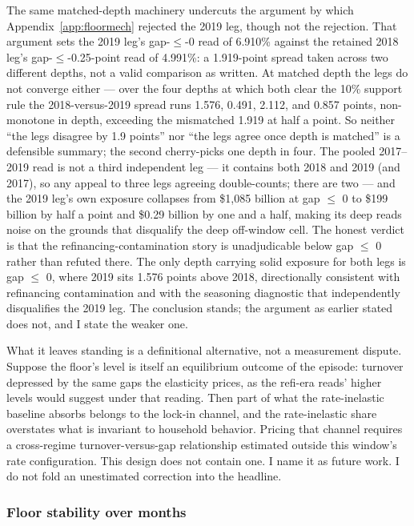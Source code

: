 The same matched-depth machinery undercuts the argument by which Appendix~\ref{app:floormech} rejected the 2019 leg, though not the rejection. That argument sets the 2019 leg's gap-$\leq$-0 read of 6.910\% against the retained 2018 leg's gap-$\leq$-0.25-point read of 4.991\%: a 1.919-point spread taken across two different depths, not a valid comparison as written. At matched depth the legs do not converge either --- over the four depths at which both clear the 10\% support rule the 2018-versus-2019 spread runs 1.576, 0.491, 2.112, and 0.857 points, non-monotone in depth, exceeding the mismatched 1.919 at half a point. So neither ``the legs disagree by 1.9 points'' nor ``the legs agree once depth is matched'' is a defensible summary; the second cherry-picks one depth in four. The pooled 2017--2019 read is not a third independent leg --- it contains both 2018 and 2019 (and 2017), so any appeal to three legs agreeing double-counts; there are two --- and the 2019 leg's own exposure collapses from \$1{,}085 billion at gap $\leq$ 0 to \$199 billion by half a point and \$0.29 billion by one and a half, making its deep reads noise on the grounds that disqualify the deep off-window cell. The honest verdict is that the refinancing-contamination story is unadjudicable below gap $\leq$ 0 rather than refuted there. The only depth carrying solid exposure for both legs is gap $\leq$ 0, where 2019 sits 1.576 points above 2018, directionally consistent with refinancing contamination and with the seasoning diagnostic that independently disqualifies the 2019 leg. The conclusion stands; the argument as earlier stated does not, and I state the weaker one.

What it leaves standing is a definitional alternative, not a measurement dispute. Suppose the floor's level is itself an equilibrium outcome of the episode: turnover depressed by the same gaps the elasticity prices, as the refi-era reads' higher levels would suggest under that reading. Then part of what the rate-inelastic baseline absorbs belongs to the lock-in channel, and the rate-inelastic share overstates what is invariant to household behavior. Pricing that channel requires a cross-regime turnover-versus-gap relationship estimated outside this window's rate configuration. This design does not contain one. I name it as future work. I do not fold an unestimated correction into the headline.

\subsubsection{Floor stability over months}

